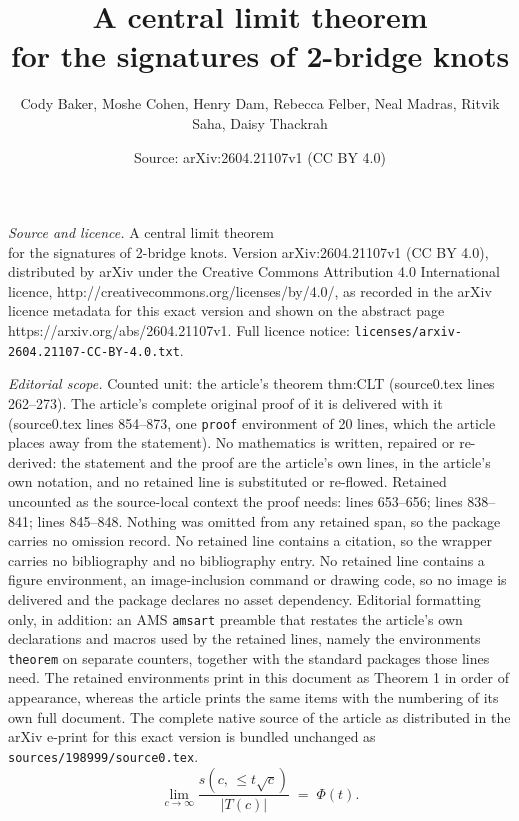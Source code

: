 \documentclass[10pt,a4paper]{amsart}
\title{A central limit theorem\\ for the signatures of 2-bridge knots}
\author{Cody Baker, Moshe Cohen, Henry Dam, Rebecca Felber, Neal Madras, Ritvik Saha, Daisy Thackrah}
\date{Source: arXiv:2604.21107v1 (CC BY 4.0)}
\begin{document}
\maketitle

\noindent\emph{Source and licence.} A central limit theorem\\ for the signatures of 2-bridge knots. Version arXiv:2604.21107v1 (CC BY 4.0), distributed by arXiv under the Creative Commons Attribution 4.0 International licence, http://creativecommons.org/licenses/by/4.0/, as recorded in the arXiv licence metadata for this exact version and shown on the abstract page https://arxiv.org/abs/2604.21107v1. Full licence notice: \texttt{licenses/arxiv-2604.21107-CC-BY-4.0.txt}.\par\smallskip

\noindent\textit{Editorial scope.} Counted unit: the article's theorem thm:CLT (source0.tex lines 262--273). The article's complete original proof of it is delivered with it (source0.tex lines 854--873, one \texttt{proof} environment of 20 lines, which the article places away from the statement). No mathematics is written, repaired or re-derived: the statement and the proof are the article's own lines, in the article's own notation, and no retained line is substituted or re-flowed.  Retained uncounted as the source-local context the proof needs: lines 653--656; lines 838--841; lines 845--848.  Nothing was omitted from any retained span, so the package carries no omission record.  No retained line contains a citation, so the wrapper carries no bibliography and no bibliography entry.  No retained line contains a figure environment, an image-inclusion command or drawing code, so no image is delivered and the package declares no asset dependency.  Editorial formatting only, in addition: an AMS \texttt{amsart} preamble that restates the article's own declarations and macros used by the retained lines, namely the environments \texttt{theorem} on separate counters, together with the standard packages those lines need.  The retained environments print in this document as Theorem 1 in order of appearance, whereas the article prints the same items with the numbering of its own full document.  The complete native source of the article as distributed in the arXiv e-print for this exact version is bundled unchanged as \texttt{sources/198999/source0.tex}.
\begin{equation}
    \label{eq.CLT2m}
    \lim_{c\rightarrow\infty}  \frac{s\left(c, \,\leq t\sqrt{c}\right)}{|T(c)|}   \;=\; \Phi(t).
\end{equation}
\end{document}
